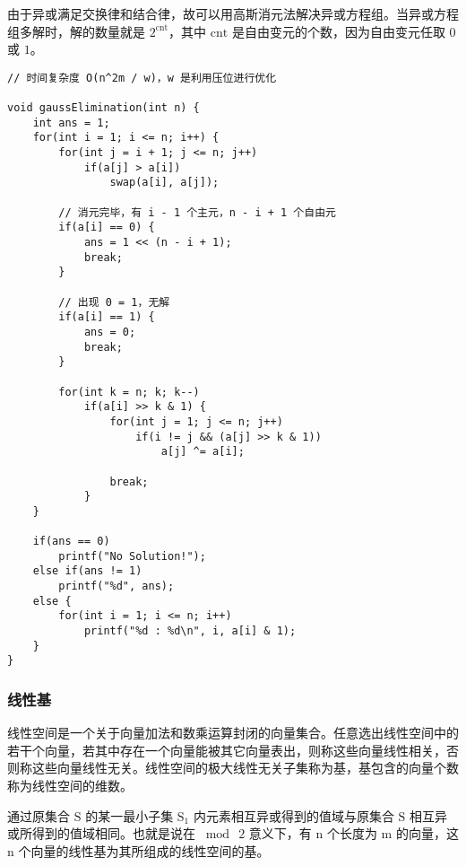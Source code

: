 \documentclass[UTF8]{article}
\begin{document}
由于异或满足交换律和结合律，故可以用高斯消元法解决异或方程组。当异或方程组多解时，解的数量就是 $\mathrm{2^{cnt}}$，其中 $\mathrm{cnt}$ 是自由变元的个数，因为自由变元任取 $\mathrm{0}$ 或 $\mathrm{1}$。
\begin{lstlisting}[caption=高斯消元法]
// 时间复杂度 O(n^2m / w)，w 是利用压位进行优化

void gaussElimination(int n) {
	int ans = 1;
	for(int i = 1; i <= n; i++) {
		for(int j = i + 1; j <= n; j++) 
			if(a[j] > a[i])
				swap(a[i], a[j]);
				
		// 消元完毕，有 i - 1 个主元，n - i + 1 个自由元
		if(a[i] == 0) {
			ans = 1 << (n - i + 1);
			break;
		}
		
		// 出现 0 = 1，无解
		if(a[i] == 1) {
			ans = 0;
			break;
		}
		
		for(int k = n; k; k--)
			if(a[i] >> k & 1) {
				for(int j = 1; j <= n; j++)
					if(i != j && (a[j] >> k & 1))
						a[j] ^= a[i];
						
				break;
			}
	}
	
	if(ans == 0)
		printf("No Solution!");
	else if(ans != 1)
		printf("%d", ans);
	else {
		for(int i = 1; i <= n; i++)
			printf("%d : %d\n", i, a[i] & 1);
	}
}
\end{lstlisting}


\subsubsection{线性基}
线性空间是一个关于向量加法和数乘运算封闭的向量集合。任意选出线性空间中的若干个向量，若其中存在一个向量能被其它向量表出，则称这些向量线性相关，否则称这些向量线性无关。线性空间的极大线性无关子集称为基，基包含的向量个数称为线性空间的维数。

通过原集合 $\mathrm{S}$ 的某一最小子集 $\mathrm{S_1}$ 内元素相互异或得到的值域与原集合 $\mathrm{S}$ 相互异或所得到的值域相同。也就是说在 $\mathrm{\bmod \  2}$ 意义下，有 $\mathrm{n}$ 个长度为 $\mathrm{m}$ 的向量，这 $\mathrm{n}$ 个向量的线性基为其所组成的线性空间的基。
\end{document}

